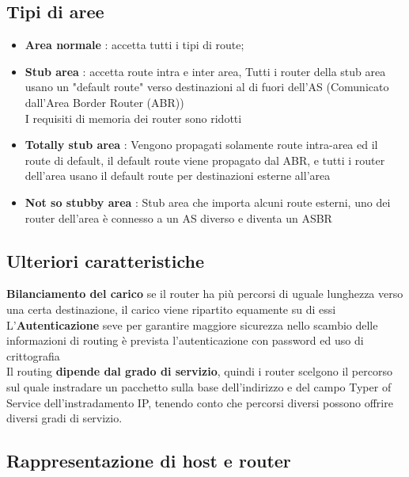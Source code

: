 \documentclass{report}
\begin{document}
            \subsection{Tipi di aree} 
                \begin{itemize}
                    \item \textbf{Area normale} : accetta tutti i tipi di route;
                    \item \textbf{Stub area} : accetta route intra e inter area, Tutti i router della stub area usano un "default route" verso destinazioni al di fuori dell'AS (Comunicato dall'Area Border Router (ABR))
                    \\
                    I requisiti di memoria dei router sono ridotti
                    \item \textbf{Totally stub area} : Vengono propagati solamente route intra-area ed il route di default, il default route viene propagato dal ABR, e tutti i router dell'area usano il default route per destinazioni esterne all'area
                    \item \textbf{Not so stubby area} : Stub area che importa alcuni route esterni, uno dei router dell'area è connesso a un AS diverso e diventa un ASBR    
                \end{itemize}
            \subsection{Ulteriori caratteristiche}
                \textbf{Bilanciamento del carico} se il router ha più percorsi di uguale lunghezza verso una certa destinazione, il carico viene ripartito equamente su di essi 
                \\
                L'\textbf{Autenticazione} seve per garantire maggiore sicurezza nello scambio delle informazioni di routing è prevista l'autenticazione con password ed uso di crittografia
                \\
                Il routing \textbf{dipende dal grado di servizio}, quindi i router scelgono il percorso sul quale instradare un pacchetto sulla base dell'indirizzo e del campo Typer of Service dell'instradamento IP, tenendo conto che percorsi diversi possono offrire diversi gradi di servizio.
            \subsection{Rappresentazione di host e router}
\end{document}
